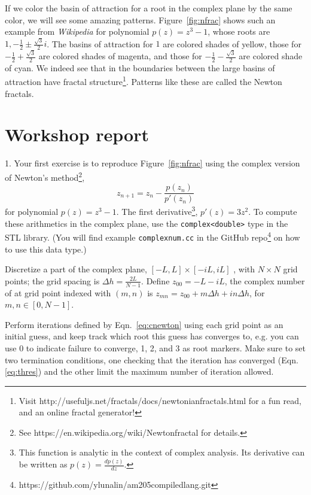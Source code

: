 \documentclass{article}
\begin{document}
If we color the basin of attraction for a root in the complex plane by the same color, we will see some amazing patterns.
Figure~\ref{fig:nfrac} shows such an example from \textit{Wikipedia} for polynomial $p(z)=z^3-1$, whose roots are $1, -\frac12 \pm \frac{\sqrt{3}}{2} i$. 
The basins of attraction for $1$ are colored shades of yellow, those for $-\frac12 + \frac{\sqrt{3}}{2}$ are colored shades of magenta, and those for  $-\frac12 - \frac{\sqrt{3}}{2}$ are colored shade of cyan. 
We indeed see that in the boundaries between the large basins of attraction have fractal structure\footnote{Visit  \color{blue} {http://usefuljs.net/fractals/docs/newtonian\textunderscore fractals.html }\color{black} for a fun read, and an online fractal generator!}.
Patterns like these are called the Newton fractals.
 
 \section*{Workshop report}
 1. Your first exercise is to reproduce Figure~\ref{fig:nfrac} using the complex version of Newton's method\footnote{See   \color{blue} https://en.wikipedia.org/wiki/Newton\textunderscore fractal \color{black} for details.},
 \begin{equation}
 z_{n+1} = z_n - \frac{p(z_n)}{p'(z_n)}
 \label{eq:cnewton}
 \end{equation}
 for polynomial $p(z)=z^3-1$. The first derivative\footnote{This function is analytic in the context of complex analysis. Its derivative can be written as $p(z) = \frac{dp(z)}{dz}$.}, $p'(z) = 3z^2$.  To compute these arithmetics in the complex plane, use the \texttt{complex<double>} type in the STL library. (You will find example \texttt{complex\textunderscore num.cc} in the GitHub repo\footnote{\color{blue}https://github.com/ylunalin/am205\textunderscore compiled\textunderscore lang.git\color{black}}  on how to use this data type.)
 
Discretize a part of the complex plane, $[ -L, L]\times [-iL, iL ]$ , with $N\times N$ grid points; the grid spacing is $\Delta h = \frac{2L}{N-1}$.
Define $z_{00} = -L - iL$, the complex number of at grid point indexed with $(m,n)$ is $z_{mn} = z_{00} + m \Delta h + i n \Delta h$, for $m, n \in [0, N-1]$. 

Perform iterations defined by Eqn.~\ref{eq:cnewton} using each grid point as an initial guess, and keep track which root this guess has converges to, e.g. you can use 0 to indicate failure to converge, 1, 2, and 3 as root markers. 
Make sure to set two termination conditions, one checking that the iteration has converged (Eqn.\ref{eq:thres}) and the other limit the maximum number of iteration allowed. 
\end{document}
